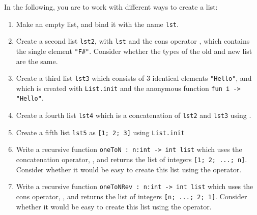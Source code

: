 In the following, you are to work with different ways to create a list:
\begin{enumerate}
\item Make an empty list, and bind it with the name \lstinline{lst}.
\item Create a second list \lstinline{lst2}, with \lstinline{lst} and the cons operator \keyword{::}, which contains the single element \lstinline{"F#"}. Consider whether the types of the old and new list are the same.
\item Create a third list \lstinline{lst3} which consists of 3 identical elements \lstinline{"Hello"}, and which is created with \lstinline{List.init} and the anonymous function \lstinline{fun i -> "Hello"}.
\item Create a fourth list \lstinline{lst4} which is a concatenation of \lstinline{lst2} and \lstinline{lst3} using .
\item Create a fifth list \lstinline{lst5} as \lstinline{[1; 2; 3]} using \lstinline{List.init}
\item Write a recursive function \lstinline{oneToN : n:int -> int list} which uses the concatenation operator, , and returns the list of integers \lstinline{[1; 2; ...; n]}. Consider whether it would be easy to create this list using the \lexeme{::} operator.
\item Write a recursive function \lstinline{oneToNRev : n:int -> int list} which uses the cons operator, \lexeme{::}, and returns the list of integers \lstinline{[n; ...; 2; 1]}.  Consider whether it would be easy to create this list using the  operator.
\end{enumerate}
